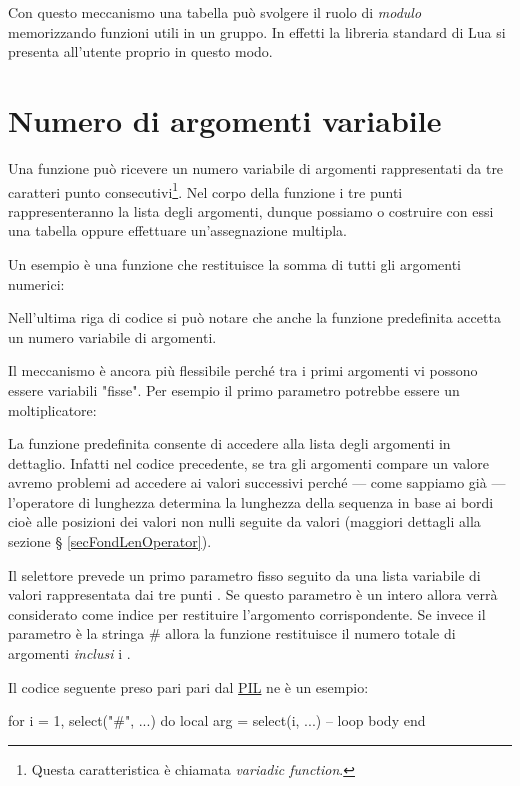 Con questo meccanismo una tabella può svolgere il ruolo di \emph{modulo}
memorizzando funzioni utili in un gruppo. In effetti la libreria standard
di Lua si presenta all'utente proprio in questo modo.


\section{Numero di argomenti variabile}

Una funzione può ricevere un numero variabile di argomenti rappresentati da
 tre caratteri punto consecutivi\footnote{Questa caratteristica è
chiamata \emph{variadic function}.}. Nel corpo della funzione i tre punti
rappresenteranno la lista degli argomenti, dunque possiamo o costruire con essi
una tabella oppure effettuare un'assegnazione multipla.

Un esempio è una funzione che restituisce la somma di tutti gli argomenti
numerici:

Nell'ultima riga di codice si può notare che anche la funzione predefinita
 accetta un numero variabile di argomenti.

Il meccanismo è ancora più flessibile perché tra i primi argomenti vi possono
essere variabili "fisse". Per esempio il primo parametro potrebbe essere un
moltiplicatore:


La funzione predefinita  consente di accedere alla lista degli
argomenti in dettaglio. Infatti nel codice precedente, se tra gli argomenti
compare un valore  avremo problemi ad accedere ai valori successivi
perché --- come sappiamo già --- l'operatore di lunghezza \key{\#} determina la
lunghezza della sequenza in base ai bordi cioè alle posizioni dei valori non
nulli seguite da valori  (maggiori dettagli alla sezione \S
\ref{secFondLenOperator}).

Il selettore prevede un primo parametro fisso seguito da una lista variabile di
valori rappresentata dai tre punti . Se questo parametro è un intero
allora verrà considerato come indice per restituire l'argomento corrispondente.
Se invece il parametro è la stringa \key\# allora la funzione restituisce il
numero totale di argomenti \emph{inclusi} i .

Il codice seguente preso pari pari dal \href{http://www.lua.org/pil/}{PIL} ne è
un esempio:
\begin{lines}
for i = 1, select("#", ...) do
    local arg = select(i, ...)
    -- loop body
end
\end{lines}


